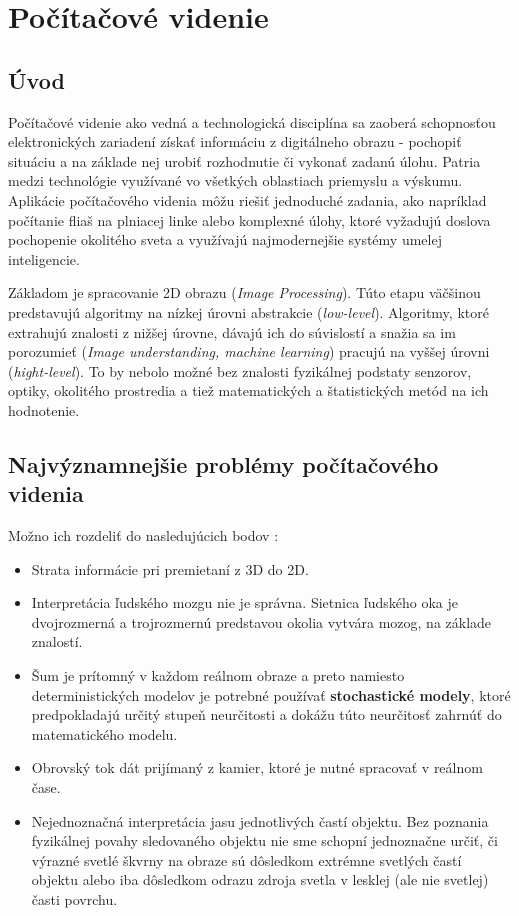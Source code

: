 \renewcommand{\theequation}{}
\setcounter{equation}{22}
\renewcommand{\theequation}{\thesection{}.\arabic{equation}}



\chapter{Počítačové videnie}
\section{Úvod}

Počítačové videnie ako vedná a technologická disciplína sa zaoberá schopnosťou elektronických zariadení získať informáciu z digitálneho obrazu - pochopiť situáciu a na základe nej urobiť rozhodnutie či vykonať zadanú úlohu. Patria medzi technológie využívané vo všetkých oblastiach priemyslu a výskumu. Aplikácie počítačového videnia môžu riešiť jednoduché zadania, ako napríklad počítanie fliaš na plniacej linke alebo komplexné úlohy, ktoré vyžadujú doslova pochopenie okolitého sveta a využívajú najmodernejšie systémy umelej inteligencie. \cite{pocitacove_videnie_v_praxi}

Základom je spracovanie 2D obrazu (\textit{Image Processing}). Túto etapu väčšinou predstavujú algoritmy na nízkej úrovni abstrakcie (\textit{low-level}). Algoritmy, ktoré extrahujú znalosti z nižšej úrovne, dávajú ich do súvislostí a snažia sa im porozumieť (\textit{Image understanding, machine learning}) pracujú na vyššej úrovni (\textit{hight-level}). To by nebolo možné bez znalosti fyzikálnej podstaty senzorov, optiky, okolitého prostredia a tiež matematických a štatistických metód na ich hodnotenie. \cite{pocitacove_videnie_v_praxi} 


\section{Najvýznamnejšie problémy počítačového videnia }
Možno ich rozdeliť do nasledujúcich bodov \cite{Analysis_and_Machine_Vision}:
\begin{itemize}
\item Strata informácie pri premietaní z 3D do 2D. 
\item Interpretácia ľudského mozgu nie je správna. Sietnica ľudského oka je dvojrozmerná a trojrozmernú predstavou okolia vytvára mozog, na základe znalostí.
\item Šum je prítomný v každom reálnom obraze a preto namiesto deterministických modelov je potrebné používať \textbf{stochastické modely}, ktoré predpokladajú určitý stupeň neurčitosti a dokážu túto neurčitosť zahrnúť do matematického modelu.
\item Obrovský tok dát prijímaný z kamier, ktoré je nutné spracovať v reálnom čase.
\item Nejednoznačná interpretácia jasu jednotlivých častí objektu. Bez poznania fyzikálnej povahy sledovaného objektu nie sme schopní jednoznačne určiť, či výrazné svetlé škvrny na obraze sú dôsledkom extrémne svetlých častí objektu alebo iba dôsledkom odrazu zdroja svetla v lesklej (ale nie svetlej) časti povrchu.
\end{itemize}


